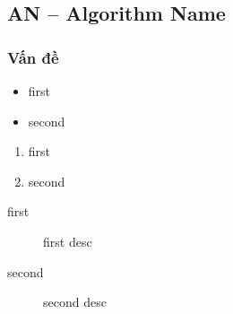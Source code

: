 \subsection{AN -- Algorithm Name}
\subsubsection{Vấn đề}
\begin{flushleft}
	\begin{itemize}
		\item first
		\item second
	\end{itemize}

	\begin{enumerate}
		\item first
		\item second
	\end{enumerate}

	\begin{description}
		\item[first] first desc
		\item[second] second desc
	\end{description}
\end{flushleft}